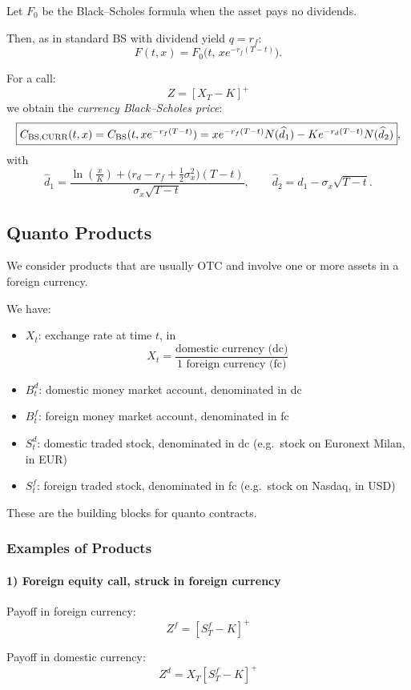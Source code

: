 \documentclass[12pt,a4paper]{article}
\theoremstyle{definition}
\begin{document}
Let $F_0$ be the Black--Scholes formula when the asset pays no dividends.

Then, as in standard BS with dividend yield $q = r_f$:
\[
F(t, x) = F_0\big(t,\, x e^{-r_f(T-t)}\big).
\]

For a call:
\[
Z = [X_T - K]^+
\]
we obtain the \emph{currency Black--Scholes price}:
\[
\fbox{$C_{\text{BS,CURR}}(t, x) = C_{\text{BS}}(t, x e^{-r_f(T-t)}) = x e^{-r_f(T-t)} N(\widehat{d}_1) - K e^{-r_d(T-t)} N(\widehat{d}_2)$},
\]
with
\[
\widehat{d}_1 = \frac{\ln\!\left(\frac{x}{K}\right) + \big(r_d - r_f + \tfrac{1}{2}\sigma_x^2\big)(T-t)}{\sigma_x\sqrt{T-t}}, \qquad \widehat{d}_2 = \widehat{d}_1 - \sigma_x\sqrt{T-t}.
\]

\subsection{Quanto Products}

We consider products that are usually OTC and involve one or more assets in a foreign currency.

We have:
\begin{itemize}
\item $X_t$: exchange rate at time $t$, in
\[
X_t = \frac{\text{domestic currency (dc)}}{\text{1 foreign currency (fc)}}
\]
\item $B_t^d$: domestic money market account, denominated in dc
\item $B_t^f$: foreign money market account, denominated in fc
\item $S_t^d$: domestic traded stock, denominated in dc (e.g.\ stock on Euronext Milan, in EUR)
\item $S_t^f$: foreign traded stock, denominated in fc (e.g.\ stock on Nasdaq, in USD)
\end{itemize}

These are the building blocks for quanto contracts.

\subsubsection{Examples of Products}

\paragraph{1) Foreign equity call, struck in foreign currency}

Payoff in foreign currency:
\[
Z^f = [S_T^f - K]^+
\]

Payoff in domestic currency:
\[
Z^d = X_T[S_T^f - K]^+
\]
\end{document}
